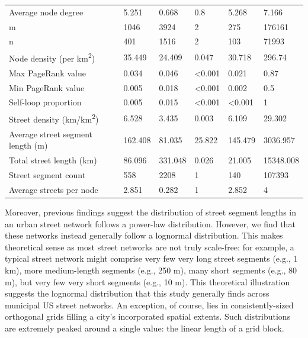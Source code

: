\documentclass{article}
\begin{document}
\begin{table}
\begin{tabular}{llllll}
	Average node degree                         & 5.251   & 0.668   & 0.8            & 5.268          & 7.166     \\
	m                                           & 1046    & 3924    & 2              & 275            & 176161    \\
	n                                           & 401     & 1516    & 2              & 103            & 71993     \\
	Node density (per km\textsuperscript{2})                      & 35.449  & 24.409  & 0.047          & 30.718         & 296.74    \\
	Max PageRank value                          & 0.034   & 0.046   & \textless0.001 & 0.021          & 0.87      \\
	Min PageRank value                          & 0.005   & 0.018   & \textless0.001 & 0.002          & 0.5       \\
	Self-loop proportion                        & 0.005   & 0.015   & \textless0.001 & \textless0.001 & 1         \\
	Street density (km/km\textsuperscript{2})                     & 6.528   & 3.435   & 0.003          & 6.109          & 29.302    \\
	Average street segment length (m)           & 162.408 & 81.035  & 25.822         & 145.479        & 3036.957  \\
	Total street length (km)                    & 86.096  & 331.048 & 0.026          & 21.005         & 15348.008 \\
	Street segment count                        & 558     & 2208    & 1              & 140            & 107393    \\
	Average streets per node                    & 2.851   & 0.282   & 1              & 2.852          & 4         \\
	\bottomrule
\end{tabular}
\end{table}

Moreover, previous findings \citep[e.g.,][]{masucci_random_2009} suggest the distribution of street segment lengths in an urban street network follows a power-law distribution. However, we find that these networks instead generally follow a lognormal distribution. This makes theoretical sense as most street networks are not truly scale-free: for example, a typical street network might comprise very few very long street segments (e.g., 1 km), more medium-length segments (e.g., 250 m), many short segments (e.g., 80 m), but very few very short segments (e.g., 10 m). This theoretical illustration suggests the lognormal distribution that this study generally finds across municipal US street networks. An exception, of course, lies in consistently-sized orthogonal grids filling a city's incorporated spatial extents. Such distributions are extremely peaked around a single value: the linear length of a grid block.
\end{document}
